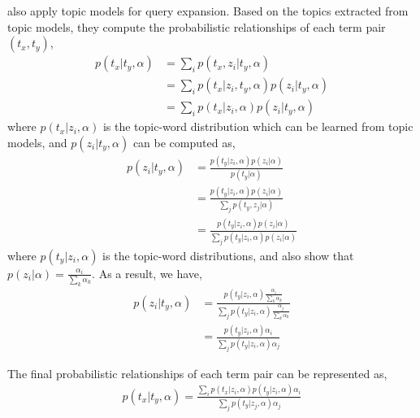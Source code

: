 \cite{Park-2009} also apply topic models for query expansion. Based on the topics extracted from topic models, they compute the probabilistic relationships of each term pair $(t_x, t_y)$,
\begin{align}
p(t_x|t_y, \alpha) &= \sum_i p(t_x, z_i | t_y, \alpha) \\
&= \sum_i p(t_x | z_i, t_y, \alpha) p(z_i | t_y, \alpha) \\
&= \sum_i p(t_x|z_i, \alpha) p(z_i|t_y, \alpha)
\end{align}
where $p(t_x|z_i, \alpha)$ is the topic-word distribution which can be learned from topic models, and $p(z_i|t_y, \alpha)$ can be computed as,
\begin{align}
p(z_i|t_y, \alpha) &= \frac{p(t_y|z_i,\alpha)p(z_i|\alpha)}{p(t_y|\alpha)} \\
&= \frac{p(t_y|z_i,\alpha)p(z_i|\alpha)}{\sum_j p(t_y, z_j|\alpha)} \\
&= \frac{p(t_y|z_i,\alpha)p(z_i|\alpha)}{\sum_j p(t_y|z_i,\alpha)p(z_i|\alpha)}
\end{align}
where $p(t_y|z_i,\alpha)$ is the topic-word distributions, and \cite{Park-2009} also show that $p(z_i|\alpha) = \frac{\alpha_i}{\sum_k \alpha_k}$.
As a result, we have,
\begin{align}
p(z_i|t_y, \alpha) &= \frac{p(t_y|z_i,\alpha) \frac{\alpha_i}{\sum_k \alpha_k} }{\sum_j p(t_y|z_i,\alpha) \frac{\alpha_j}{\sum_k \alpha_k}} \\
&= \frac{p(t_y|z_i,\alpha) \alpha_i}{\sum_j p(t_y|z_i,\alpha) \alpha_j}
\end{align}

The final probabilistic relationships of each term pair  can be represented as,
\begin{align}
p(t_x|t_y, \alpha) = \frac{\sum_i p(t_x|z_i, \alpha) p(t_y|z_i,\alpha) \alpha_i }{\sum_j p(t_y|z_j,\alpha) \alpha_j}
\end{align}


